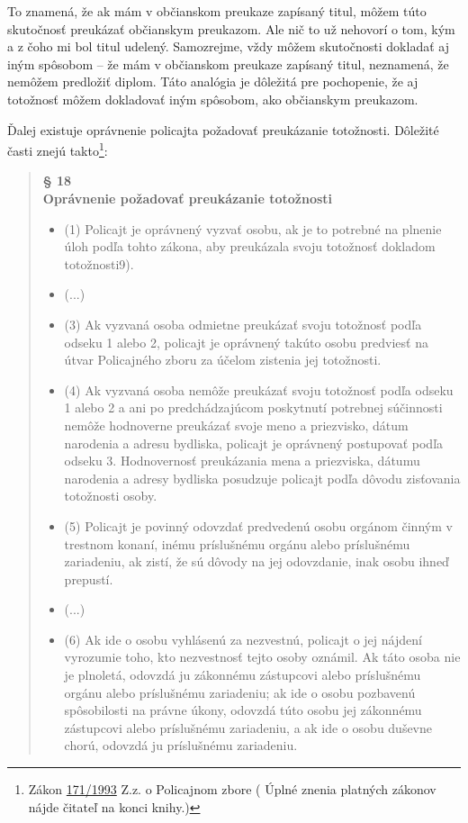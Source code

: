 \documentclass[openany]{book}
\begin{document}
To znamená, že ak mám v občianskom preukaze zapísaný titul, môžem túto skutočnosť preukázať občianskym preukazom. Ale nič to už nehovorí o tom, kým a z čoho mi bol titul udelený. Samozrejme, vždy môžem skutočnosti dokladať aj iným spôsobom -- že mám v občianskom preukaze zapísaný titul, neznamená, že nemôžem predložiť diplom. Táto analógia je dôležitá pre pochopenie, že aj totožnosť môžem dokladovať iným spôsobom, ako občianskym preukazom.

Ďalej existuje oprávnenie policajta požadovať preukázanie totožnosti. Dôležité časti znejú takto\footnote{Zákon \href{http://jaspi.justice.gov.sk/jaspiw1/index_jaspi0.asp?MOD=html&FIR=demo&JEL=n&AGE=zak&IDC=171/1993}{171/1993} Z.z. o Policajnom zbore (
Úplné znenia platných zákonov nájde čitateľ na konci knihy.)}:

\begin{quote}
\textbf{§ 18\\
Oprávnenie požadovať preukázanie totožnosti}
\begin{itemize}

\item[] (1) Policajt je oprávnený vyzvať osobu, ak je to potrebné na plnenie úloh podľa tohto zákona, aby preukázala svoju totožnosť dokladom totožnosti9).
\item[] (...)
\item[] (3) Ak vyzvaná osoba odmietne preukázať svoju totožnosť podľa odseku 1 alebo 2, policajt je oprávnený takúto osobu predviesť na útvar Policajného zboru za účelom zistenia jej totožnosti.

\item[] (4) Ak vyzvaná osoba nemôže preukázať svoju totožnosť podľa odseku 1 alebo 2 a ani po predchádzajúcom poskytnutí potrebnej súčinnosti nemôže hodnoverne preukázať svoje meno a priezvisko, dátum narodenia a adresu bydliska, policajt je oprávnený postupovať podľa odseku 3. Hodnovernosť preukázania mena a priezviska, dátumu narodenia a adresy bydliska posudzuje policajt podľa dôvodu zisťovania totožnosti osoby.

\item[] (5) Policajt je povinný odovzdať predvedenú osobu orgánom činným v trestnom konaní, inému príslušnému orgánu alebo príslušnému zariadeniu, ak zistí, že sú dôvody na jej odovzdanie, inak osobu ihneď prepustí.

\item[] (...)
\item[] (6) Ak ide o osobu vyhlásenú za nezvestnú, policajt o jej nájdení vyrozumie toho, kto nezvestnosť tejto osoby oznámil. Ak táto osoba nie je plnoletá, odovzdá ju zákonnému zástupcovi alebo príslušnému orgánu alebo príslušnému zariadeniu; ak ide o osobu pozbavenú spôsobilosti na právne úkony, odovzdá túto osobu jej zákonnému zástupcovi alebo príslušnému zariadeniu, a ak ide o osobu duševne chorú, odovzdá ju príslušnému zariadeniu.


\end{itemize}
\end{quote}
\end{document}
